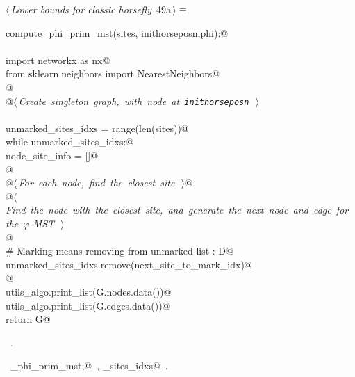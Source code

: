 \documentclass[11.5pt]{report}
\begin{document}
\begin{flushleft} \small\label{scrap75}\raggedright\small
{} $\langle\,${\itshape Lower bounds for classic horsefly}\nobreak\ {\footnotesize {49a}}$\,\rangle\equiv$
\vspace{-1ex}
\begin{list}{}{} \item
\mbox{}\verb@def compute_phi_prim_mst(sites, inithorseposn,phi):@\\
\mbox{}\verb@@\\
\mbox{}\verb@     import networkx as nx@\\
\mbox{}\verb@     from sklearn.neighbors import NearestNeighbors@\\
\mbox{}\verb@     @\\
\mbox{}\verb@     @\hbox{$\langle\,${\itshape Create singleton graph, with node at \verb|inithorseposn|}\nobreak\ {\footnotesize {}}$\,\rangle$}\verb@@\\
\mbox{}\verb@@\\
\mbox{}\verb@     unmarked_sites_idxs = range(len(sites))@\\
\mbox{}\verb@     while unmarked_sites_idxs:@\\
\mbox{}\verb@          node_site_info = []@\\
\mbox{}\verb@          @\\
\mbox{}\verb@          @\hbox{$\langle\,${\itshape For each node, find the closest site}\nobreak\ {\footnotesize {}}$\,\rangle$}\verb@    @\\
\mbox{}\verb@          @\hbox{$\langle\,${\itshape Find the node with the closest site, and generate the next node and edge for the $\varphi$-MST}\nobreak\ {\footnotesize {}}$\,\rangle$}\verb@@\\
\mbox{}\verb@          @\\
\mbox{}\verb@          # Marking means removing from unmarked list :-D@\\
\mbox{}\verb@          unmarked_sites_idxs.remove(next_site_to_mark_idx)@\\
\mbox{}\verb@          @\\
\mbox{}\verb@     utils_algo.print_list(G.nodes.data())@\\
\mbox{}\verb@     utils_algo.print_list(G.edges.data())@\\
\mbox{}\verb@     return G@\\
\mbox{}\verb@@{\NWsep}
\end{list}
\vspace{-1.5ex}
\footnotesize
\begin{list}{}{\setlength{\itemsep}{-\parsep}\setlength{\itemindent}{-\leftmargin}}
\item \NWtxtMacroRefIn\ .
\item \NWtxtIdentsDefed\nobreak\  \verb@compute_phi_prim_mst,@\nobreak\ \NWtxtIdentsNotUsed, \verb@unmarked_sites_idxs@\nobreak\ .
\item{}
\end{list}
\vspace{4ex}
\end{flushleft}
\end{document}
